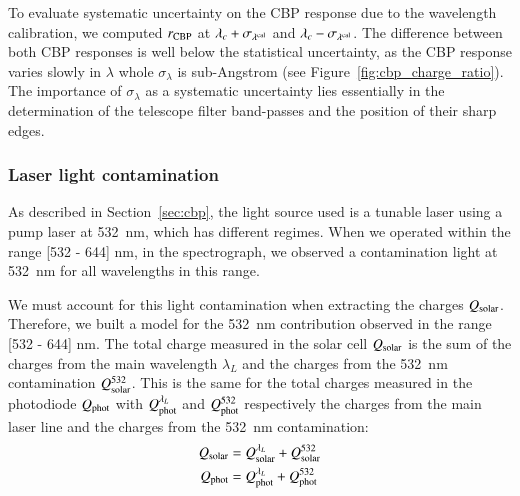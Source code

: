 To evaluate systematic uncertainty on the CBP response due to the wavelength calibration, we computed $r_{\rm CBP}$ at $\lambda_c+\sigma_{\lambda^{\rm cal}}$ and $\lambda_c-\sigma_{\lambda^{\rm cal}}$. The difference between both CBP responses is well below the statistical uncertainty, as the CBP response varies slowly in $\lambda$ whole $\sigma_\lambda$ is sub-Angstrom (see Figure~\ref{fig:cbp_charge_ratio}). The importance of $\sigma_\lambda$ as a systematic uncertainty lies essentially in the determination of the telescope filter band-passes and the position of their sharp edges.


\subsubsection{Laser light contamination}
\label{sec:532_cont}

As described in Section~\ref{sec:cbp}, the light source used is a tunable laser using a pump laser at \SI{532}{\nano\meter}, which has different regimes. When we operated within the range [532 - 644] nm, in the spectrograph, we observed a contamination light at \SI{532}{\nano\meter} for all wavelengths in this range. 

We must account for this light contamination when extracting the charges $Q_{\mathrm{solar}}$. Therefore, we built a model for the \SI{532}{\nano\meter} contribution observed in the range [532 - 644] nm. The total charge measured in the solar cell $Q_{\mathrm{solar}}$ is the sum of the charges from the main wavelength $\lambda_L$ and the charges from the \SI{532}{\nm} contamination $Q_{\mathrm{solar}}^{532}$. This is the same for the total charges measured in the photodiode $Q_{\mathrm{phot}}$ with $Q_{\mathrm{phot}}^{\lambda_L}$ and $Q_{\mathrm{phot}}^{532}$ respectively the charges from the main laser line and the charges from the \SI{532}{\nm} contamination:
\begin{align}
Q_{\mathrm{solar}} & = Q_{\mathrm{solar}}^{\lambda_L} + Q_{\mathrm{solar}}^{532} \label{eq:qsolar_mes} \\
Q_{\mathrm{phot}} & = Q_{\mathrm{phot}}^{\lambda_L} + Q_{\mathrm{phot}}^{532} \label{eq:qphot_mes}
\end{align}

